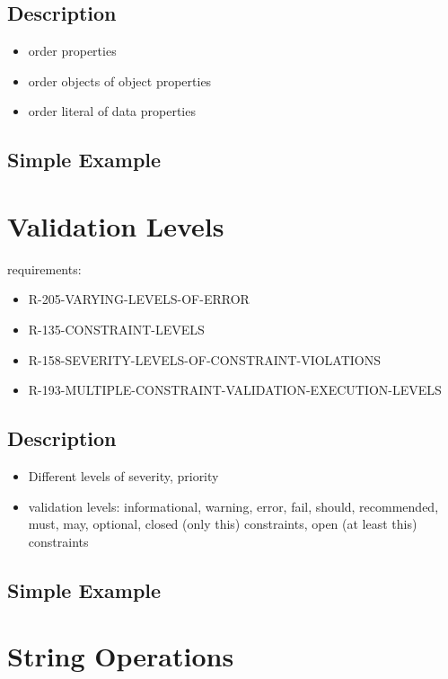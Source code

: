 \documentclass{llncs}
\begin{document}
\subsection{Description}

\begin{itemize}
	\item order properties
	\item order objects of object properties
	\item order literal of data properties
\end{itemize}

\subsection{Simple Example}



\section{Validation Levels}

requirements:

\begin{itemize}
	\item R-205-VARYING-LEVELS-OF-ERROR
	\item R-135-CONSTRAINT-LEVELS
	\item R-158-SEVERITY-LEVELS-OF-CONSTRAINT-VIOLATIONS
	\item R-193-MULTIPLE-CONSTRAINT-VALIDATION-EXECUTION-LEVELS
\end{itemize}

\subsection{Description}

\begin{itemize}
  \item Different levels of severity, priority
	\item validation levels: informational, warning, error, fail, should, recommended, must, may, optional, closed (only this) constraints, open (at least this) constraints
\end{itemize}

\subsection{Simple Example}



\section{String Operations}
\end{document}
